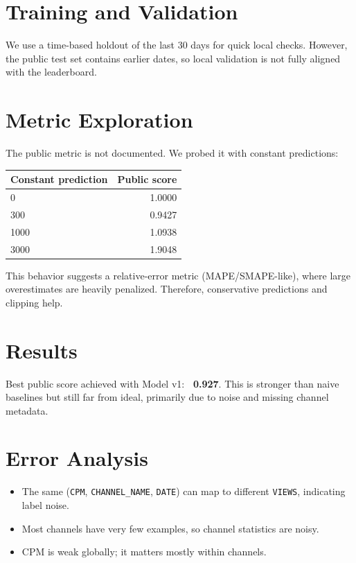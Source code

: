 \documentclass[11pt]{article}
\begin{document}
\section{Training and Validation}
We use a time-based holdout of the last 30 days for quick local checks.
However, the public test set contains earlier dates, so local validation
is not fully aligned with the leaderboard.

\section{Metric Exploration}
The public metric is not documented. We probed it with constant predictions:

\begin{center}
\begin{tabular}{lr}
\toprule
Constant prediction & Public score \\
\midrule
0 & 1.0000 \\
300 & 0.9427 \\
1000 & 1.0938 \\
3000 & 1.9048 \\
\bottomrule
\end{tabular}
\end{center}

This behavior suggests a relative-error metric (MAPE/SMAPE-like),
where large overestimates are heavily penalized.
Therefore, conservative predictions and clipping help.

\section{Results}
Best public score achieved with Model v1: \textbf{~0.927}.
This is stronger than naive baselines but still far from ideal,
primarily due to noise and missing channel metadata.

\section{Error Analysis}
\begin{itemize}
    \item The same (\texttt{CPM}, \texttt{CHANNEL\_NAME}, \texttt{DATE})
    can map to different \texttt{VIEWS}, indicating label noise.
    \item Most channels have very few examples, so channel statistics are noisy.
    \item CPM is weak globally; it matters mostly within channels.
\end{itemize}
\end{document}
